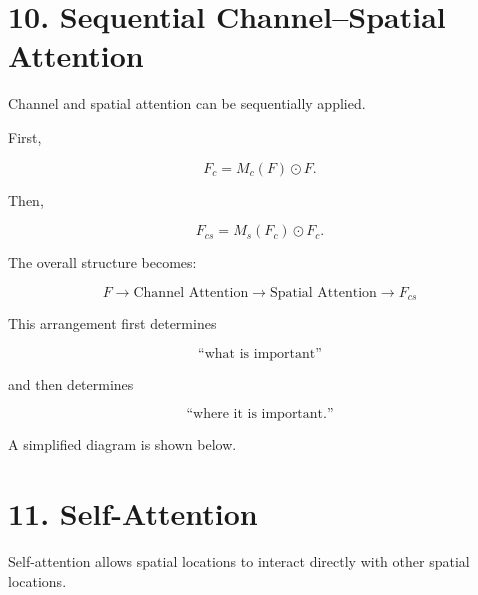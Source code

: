 \documentclass[10pt]{article}
\begin{document}
\section*{10. Sequential Channel--Spatial Attention}

Channel and spatial attention can be sequentially applied.

First,

\[
F_c
=
M_c(F)\odot F.
\]

Then,

\[
F_{cs}
=
M_s(F_c)\odot F_c.
\]

The overall structure becomes:

\[
\boxed{
F
\rightarrow
\text{Channel Attention}
\rightarrow
\text{Spatial Attention}
\rightarrow
F_{cs}
}
\]

This arrangement first determines

\[
\text{``what is important''}
\]

and then determines

\[
\text{``where it is important.''}
\]

A simplified diagram is shown below.

\begin{center}


\end{center}
\section*{11. Self-Attention}

Self-attention allows spatial locations to interact directly with other
spatial locations.
\end{document}
